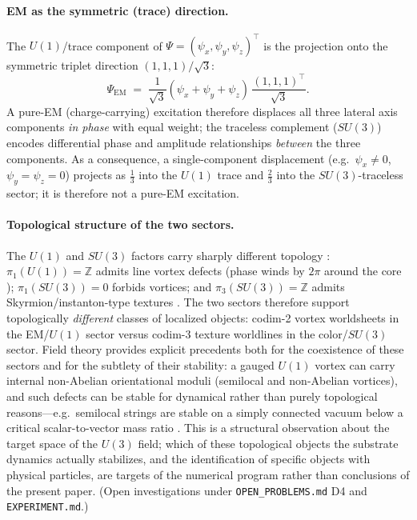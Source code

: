\paragraph{EM as the symmetric (trace) direction.}
The $U(1)$/trace component of $\Psi=(\psi_x,\psi_y,\psi_z)^\top$ is the projection onto the
symmetric triplet direction $(1,1,1)/\sqrt{3}$:
\begin{equation}
  \Psi_{\mathrm{EM}} \;=\; \frac{1}{\sqrt{3}}(\psi_x+\psi_y+\psi_z)\,\frac{(1,1,1)^\top}{\sqrt{3}}.
  \label{eq:em-trace}
\end{equation}
A pure-EM (charge-carrying) excitation therefore displaces all three lateral axis components
\emph{in phase} with equal weight; the traceless complement ($SU(3)$) encodes differential
phase and amplitude relationships \emph{between} the three components.
As a consequence, a single-component displacement (e.g.\ $\psi_x\neq0$, $\psi_y=\psi_z=0$)
projects as $\tfrac{1}{3}$ into the $U(1)$ trace and $\tfrac{2}{3}$ into the $SU(3)$-traceless
sector; it is therefore not a pure-EM excitation.

\paragraph{Topological structure of the two sectors.}
The $U(1)$ and $SU(3)$ factors carry sharply different topology
\citep{Kibble1976Topology,VilenkinShellard1994,MantonSutcliffe2004}:
$\pi_1(U(1))=\mathbb{Z}$ admits line vortex defects (phase winds by $2\pi$ around the core
\citep{NielsenOlesen1973,HindmarshKibble1995CosmicStrings});
$\pi_1(SU(3))=0$ forbids vortices; and $\pi_3(SU(3))=\mathbb{Z}$ admits Skyrmion/instanton-type textures
\citep{Skyrme1962,AtiyahManton1989}.
The two sectors therefore support topologically \emph{different} classes of
localized objects: codim-2 vortex worldsheets in the EM/$U(1)$ sector versus codim-3 texture
worldlines in the color/$SU(3)$ sector.
Field theory provides explicit precedents both for the coexistence of these sectors and for the subtlety of
their stability: a gauged $U(1)$ vortex can carry internal non-Abelian orientational moduli (semilocal and
non-Abelian vortices), and such defects can be stable for dynamical rather than purely topological reasons---e.g.\
semilocal strings are stable on a simply connected vacuum below a critical scalar-to-vector mass ratio
\citep{VachaspatiAchucarro1991Semilocal,AchucarroVachaspati2000,AuzziBolognesiEvslinKonishiYung2003,Eto2021OrientationalModuli}.
This is a structural observation about the target space of the $U(3)$ field; which of these
topological objects the substrate dynamics actually stabilizes, and the identification of specific
objects with physical particles, are targets of the numerical program rather than conclusions of
the present paper.
(Open investigations under \texttt{OPEN\_PROBLEMS.md} D4 and \texttt{EXPERIMENT.md}.)

